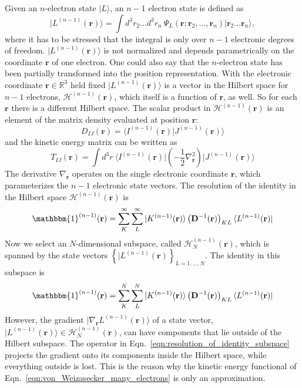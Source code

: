 \documentclass[journal=jacsat,manuscript=article]{achemso}
\newcommand\m[1]{\mathbf{#1}}
\renewcommand\vec[1]{\mathbf{#1}}
\begin{document}
Given an $n$-electron state $\vert L \rangle$, an $n-1$ electron state is defined as
\begin{equation}
\vert L^{(n-1)}(\vec{r}) \rangle = \int d^3\!r_2 \ldots d^3\!r_n ~ \Psi_{L}(\vec{r};\vec{r}_2,\ldots,\vec{r}_n) \vert \vec{r}_2 \ldots \vec{r}_{n} \rangle,
\end{equation}
where it has to be stressed that the integral is only over $n-1$ electronic degrees of freedom.
$\vert L^{(n-1)}(\vec{r}) \rangle$ is not normalized and depends parametrically on the coordinate $\vec{r}$ of one electron. One could also say that the $n$-electron state has been partially transformed into the position representation. With the electronic coordinate $\vec{r} \in \mathbb{R}^{3}$ held fixed $\vert L^{(n-1)}(\vec{r}) \rangle$ is a vector in the Hilbert space for $n-1$ electrons, $\mathcal{H}^{(n-1)}(\vec{r})$, which itself is a function of $\vec{r}$, as well. So for each $\vec{r}$ there is a different Hilbert space. The scalar product in $\mathcal{H}^{(n-1)}(\vec{r})$ is an element of the matrix density evaluated at position $\vec{r}$:
\begin{equation}
D_{IJ}(\vec{r}) = \langle I^{(n-1)}(\vec{r}) \vert J^{(n-1)}(\vec{r}) \rangle
\end{equation}
and the kinetic energy matrix can be written as
\begin{equation}
T_{IJ}(\vec{r}) = \int d^3\!r ~ \langle I^{(n-1)}(\vec{r}) \vert \left(-\frac{1}{2} \nabla^2_{\vec{r}} \right) \vert J^{(n-1)}(\vec{r}) \rangle
\end{equation}
The derivative $\nabla_{\vec{r}}$ operates on the single electronic coordinate $\vec{r}$, which parameterizes the $n-1$ electronic state vectors.
The resolution of the identity in the Hilbert space $\mathcal{H}^{(n-1)}(\vec{r})$ is
\begin{equation}
\mathbbm{1}^{(n-1)}(\vec{r}) = \sum_{K}^{\infty} \sum_{L}^{\infty} \vert K^{(n-1)}(\vec{r}) \rangle \left(\m{D}^{-1}(\vec{r}) \right)_{KL} \langle L^{(n-1)}(\vec{r}) \vert \label{eqn:eqn:resolution_of_identity}
\end{equation}
Now we select an $N$-dimensional subspace, called $\mathcal{H}^{(n-1)}_N(\vec{r})$, which is spanned by the state vectors $\left\{\vert L^{(n-1)}(\vec{r}) \right\}_{L=1,\ldots,N}$. The identity in this subspace is
\begin{equation}
\mathbbm{1}^{(n-1)}(\vec{r}) = \sum_{K}^{N} \sum_{L}^{N} \vert K^{(n-1)}(\vec{r}) \rangle \left(\m{D}^{-1}(\vec{r}) \right)_{KL} \langle L^{(n-1)}(\vec{r}) \vert \label{eqn:resolution_of_identity_subspace}
\end{equation}
However, the gradient $\vert \nabla_{\vec{r}} L^{(n-1)}(\vec{r}) \rangle$ of a state vector, $\vert L^{(n-1)}(\vec{r}) \rangle \in \mathcal{H}^{(n-1)}_N(\vec{r})$, can have components that lie outside of the Hilbert subspace. The operator in Eqn.~\ref{eqn:resolution_of_identity_subspace} projects the gradient onto its components inside the Hilbert space, while everything outside is lost. This is the reason why the kinetic energy functional of Eqn.~\ref{eqn:von_Weizasecker_many_electrons} is only an approximation.
\end{document}
